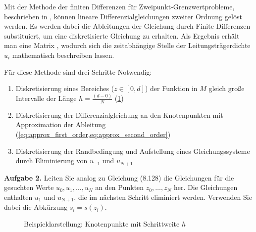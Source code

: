 	Mit der Methode der finiten Differenzen für Zweipunkt-Grenzwertprobleme, beschrieben in \cite[p. 442]{Atkinson.2004}, können lineare Differenzialgleichungen zweiter Ordnung gelöst werden. Es werden dabei die Ableitungen der Gleichung durch Finite Differenzen substituiert, um eine diskretisierte Gleichung zu erhalten.
	Als Ergebnis erhält man eine Matrix , wodurch sich die zeitabhängige Stelle der Leitungsträgerdichte $u_i$ mathematisch beschreiben lassen. 
	
	Für diese Methode sind drei Schritte Notwendig:
	\begin{enumerate}
		\item Diskretisierung eines Bereiches ($z\in [0,d]$) der Funktion in $M$ gleich große Intervalle der Länge $h=\frac{(d-0)}{N}$ (\cref{fig:bsp_knotenpunkte})
		\item Diskretisierung der Differenzialgleichung an den Knotenpunkten mit Approximation der Ableitung (\cref{eq:approx_first_order,eq:approx_second_order})
		\item Diskretisierung der Randbedingung und Aufstellung eines Gleichungssysteme durch Eliminierung von $u_{-1}$ und $u_{N+1}$
	\end{enumerate}

 \begin{mybox}
	\textbf{Aufgabe 2.} Leiten Sie analog zu Gleichung (8.128) die Gleichungen für die gesuchten Werte  $u_0, u_1, \dots , u_N$ an den Punkten $z_0,\dots , z_N$ her. Die Gleichungen enthalten $u_1$ und $u_\mathrm{N+1}$, die im nächsten Schritt eliminiert werden. Verwenden Sie dabei die Abkürzung $ s_i = s(z_i)$.\cite{Prof.Dr.AndreasZeiser.April2021} 
\end{mybox}
	
 
 \begin{figure}[htb]
 	\centering
\caption{Beispieldarstellung: Knotenpunkte mit Schrittweite $h$}
\label{fig:bsp_knotenpunkte}
 \end{figure}

